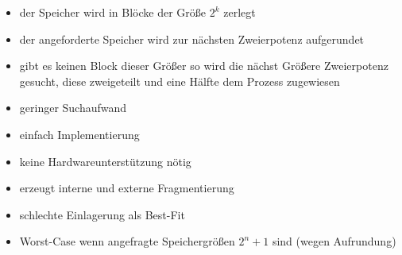 \documentclass[12pt,a4paper]{article}
\begin{document}
\begin{itemize}
\item der Speicher wird in Blöcke der Größe $2^k$ zerlegt
\item der angeforderte Speicher wird zur nächsten Zweierpotenz aufgerundet
\item gibt es keinen Block dieser Größer so wird die nächst Größere Zweierpotenz gesucht, diese zweigeteilt und eine Hälfte dem Prozess zugewiesen
\item geringer Suchaufwand
\item einfach Implementierung
\item keine Hardwareunterstützung nötig
\item erzeugt interne und externe Fragmentierung
\item schlechte Einlagerung als Best-Fit
\item Worst-Case wenn angefragte Speichergrößen $2^n +  1$ sind (wegen Aufrundung)
\end{itemize}
\end{document}
